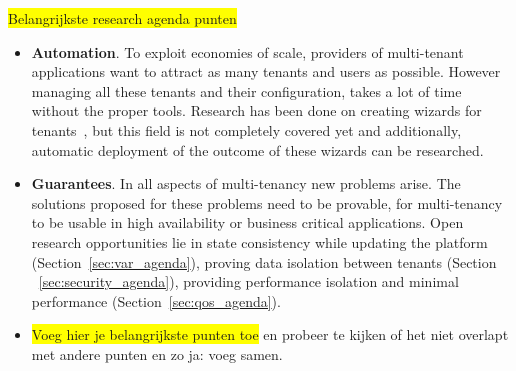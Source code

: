 \documentclass{article}
\newcommand{\highlight}[1]{\colorbox{yellow}{#1}}
\begin{document}
\highlight{Belangrijkste research agenda punten}
\begin{itemize}

\item \textbf{Automation}. 
To exploit economies of scale, providers of multi-tenant applications want to attract as many tenants and users as possible. 
However managing all these tenants and their configuration, takes a lot of time without the proper tools. 
Research has been done on creating wizards for tenants~\cite{mietzner2008generation,mietzner2008defining}, but this field is not completely covered yet and additionally, automatic deployment of the outcome of these wizards can be researched. 
\item \textbf{Guarantees}. 
In all aspects of multi-tenancy new problems arise. 
The solutions proposed for these problems need to be provable, for multi-tenancy to be usable in high availability or business critical applications. 
Open research opportunities lie in state consistency while updating the platform (Section~\ref{sec:var_agenda}), proving data isolation between tenants (Section ~\ref{sec:security_agenda}), providing performance isolation and minimal performance (Section~\ref{sec:qos_agenda}).

\item \highlight{Voeg hier je belangrijkste punten toe}  en probeer te kijken of het niet overlapt met andere punten en zo ja: voeg samen.
\end{itemize}



\end{document}
